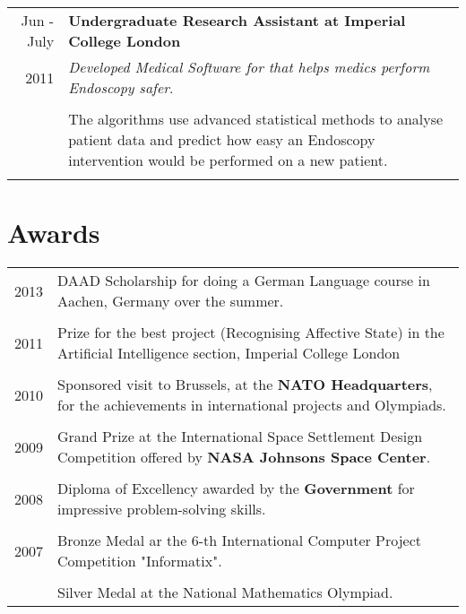 \documentclass[a4paper,10pt]{article} %
\begin{document}
\begin{tabular}{r|p{15cm}}

Jun - July & \large\textbf{Undergraduate Research Assistant at Imperial College
London}\\
2011 & \emph{Developed Medical Software for that helps medics perform Endoscopy
safer}.\\
& \\
& The algorithms use advanced statistical methods to analyse patient data and
predict how easy an Endoscopy intervention would be performed on a new
patient.\\

\multicolumn{2}{c}{} \\
\end{tabular}


\section*{Awards}

\begin{tabular}{r|p{15cm}}
2013 & DAAD Scholarship for doing a German Language course in Aachen, Germany over the summer.\\
& \\
2011 & Prize for the best project (Recognising Affective State) in the
Artificial Intelligence section, Imperial College London\\
& \\
2010 & Sponsored visit to Brussels, at the \textbf{NATO Headquarters}, for the
achievements in international projects and Olympiads.\\
& \\
2009 & Grand Prize at the International Space Settlement Design Competition
offered by \textbf{NASA Johnsons Space Center}.\\
& \\
2008 & Diploma of Excellency awarded by the \textbf{Government} for impressive
problem-solving skills.\\
& \\
2007 & Bronze Medal ar the 6-th International Computer Project Competition
"Informatix".\\
& \\
& Silver Medal at the National Mathematics Olympiad.
\end{tabular}
\end{document}
